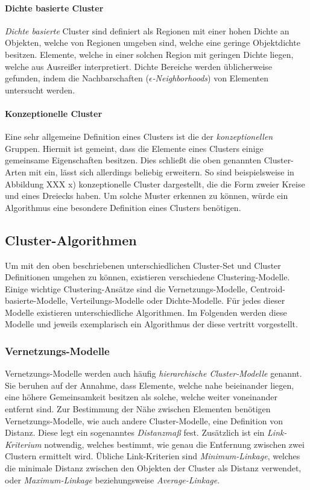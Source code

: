 \paragraph{Dichte basierte Cluster}
\textit{Dichte basierte} Cluster sind definiert als Regionen mit einer hohen Dichte an Objekten, welche von
Regionen umgeben sind, welche eine geringe Objektdichte besitzen. Elemente, welche in einer solchen Region
mit geringen Dichte liegen, welche aus Ausreißer interpretiert. Dichte Bereiche werden üblicherweise
gefunden, indem die Nachbarschaften (\textit{$\epsilon$-Neighborhoods}) von Elementen untersucht werden.

\paragraph{Konzeptionelle Cluster}
Eine sehr allgemeine Definition eines Clusters ist die der \textit{konzeptionellen} Gruppen. Hiermit ist
gemeint, dass die Elemente eines Clusters einige gemeinsame Eigenschaften besitzen. Dies schließt die oben genannten
Cluster-Arten mit ein, lässt sich allerdings beliebig erweitern. So sind beispielsweise in Abbildung XXX x)
konzeptionelle Cluster dargestellt, die die Form zweier Kreise und eines Dreiecks haben. Um solche Muster
erkennen zu können, würde ein Algorithmus eine besondere Definition eines Clusters benötigen.



\subsection{Cluster-Algorithmen}
\label{sec:cluster_algos}

Um mit den oben beschriebenen unterschiedlichen Cluster-Set und Cluster Definitionen umgehen zu können,
existieren verschiedene Clustering-Modelle.
Einige wichtige Clustering-Ansätze sind die Vernetzungs-Modelle, Centroid-basierte-Modelle, Verteilungs-Modelle
oder Dichte-Modelle. Für jedes dieser Modelle existieren unterschiedliche Algorithmen. Im Folgenden werden
diese Modelle und jeweils exemplarisch ein Algorithmus der diese vertritt vorgestellt.

\subsubsection{Vernetzungs-Modelle}

Vernetzungs-Modelle werden auch häufig \textit{hierarchische Cluster-Modelle} genannt. Sie beruhen auf
der Annahme, dass Elemente, welche nahe beieinander liegen, eine höhere Gemeinsamkeit besitzen als solche,
welche weiter voneinander entfernt sind. Zur Bestimmung der Nähe zwischen Elementen benötigen Vernetzungs-Modelle,
wie auch andere Cluster-Modelle, eine
Definition von Distanz. Diese legt ein sogenanntes \textit{Distanzmaß} fest. Zusätzlich ist ein \textit{Link-Kriterium} notwendig,
welches bestimmt, wie genau die Entfernung zwischen zwei Clustern ermittelt wird. Übliche Link-Kriterien
sind \textit{Minimum-Linkage}, welches die minimale Distanz zwischen den Objekten der Cluster als Distanz verwendet,
oder \textit{Maximum-Linkage} beziehungsweise \textit{Average-Linkage}. \cite[]{Jain1999, GeorgeSeif2018}

